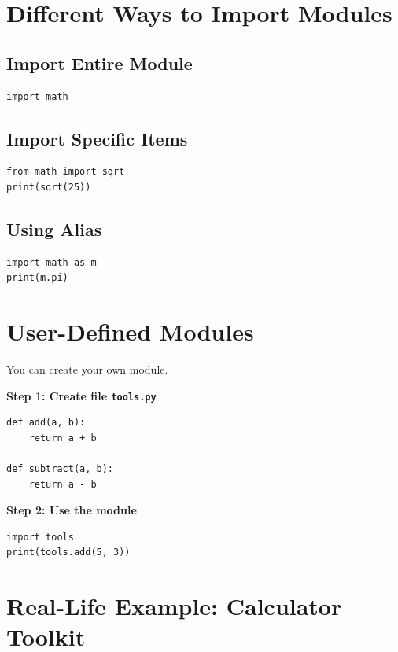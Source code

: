 \section{Different Ways to Import Modules}

\subsection{Import Entire Module}

\begin{verbatim}
import math
\end{verbatim}

\subsection{Import Specific Items}

\begin{verbatim}
from math import sqrt
print(sqrt(25))
\end{verbatim}

\subsection{Using Alias}

\begin{verbatim}
import math as m
print(m.pi)
\end{verbatim}

\section{User-Defined Modules}

You can create your own module.

\textbf{Step 1: Create file \texttt{tools.py}}

\begin{verbatim}
def add(a, b):
    return a + b

def subtract(a, b):
    return a - b
\end{verbatim}

\textbf{Step 2: Use the module}

\begin{verbatim}
import tools
print(tools.add(5, 3))
\end{verbatim}

\section{Real-Life Example: Calculator Toolkit}

